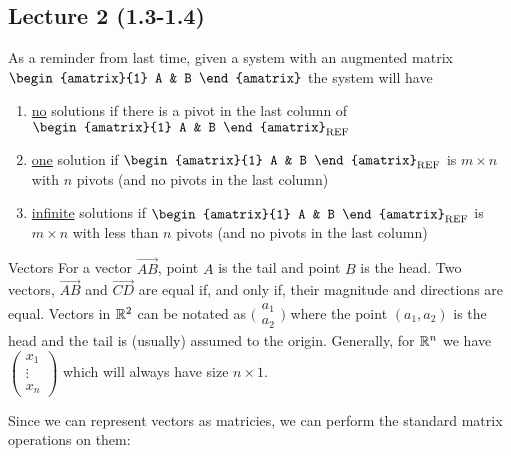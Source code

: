 \subsection{Lecture 2 (1.3-1.4)}

As a reminder from last time, given a system with an augmented matrix 
$\begin{amatrix}{1}
    A & B
\end{amatrix}$
the system will have
\begin{enumerate}
    \item \underline{no} solutions if there is a pivot in the last column of 
    $\begin{amatrix}{1}
        A & B
    \end{amatrix}_{\text{REF}}$
    \item \underline{one} solution if $\begin{amatrix}{1}
        A & B
    \end{amatrix}_{\text{REF}}$ is $m \times n$ with $n$ pivots (and no pivots in the last column)
    \item \underline{infinite} solutions if $\begin{amatrix}{1}
        A & B
    \end{amatrix}_{\text{REF}}$ is $m \times n$ with less than $n$ pivots (and no pivots in the last column)
\end{enumerate}

\begin{defbox}{Vectors}{}
    For a vector $\vec{AB}$, point $A$ is the tail and point $B$ is the head. Two vectors, $\vec{AB}$ and $\vec{CD}$ are equal if, and only if, their magnitude and directions are equal. Vectors in $\mathbb R^{2}$ can be notated as $\big(\begin{smallmatrix} a_1 \\ a_ 2\end{smallmatrix}\big)$ where the point $(a_1, a_2)$ is the head and the tail is (usually) assumed to the origin. Generally, for $\mathbb R^{n}$ we have $\begin{pmatrix} x_1 \\ \vdots \\ x_n \end{pmatrix}$ which will always have size $n \times 1$.
\end{defbox}

Since we can represent vectors as matricies, we can perform the standard matrix operations on them:

